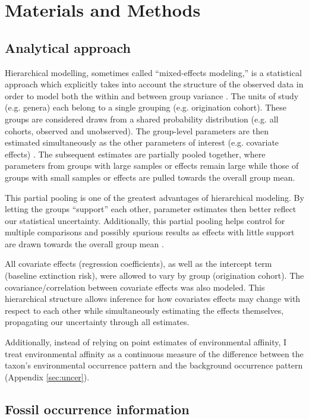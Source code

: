 \documentclass[12pt,letterpaper]{article}
\begin{document}
\section{Materials and Methods}

\subsection{Analytical approach}

Hierarchical modelling, sometimes called ``mixed-effects modeling,'' is a statistical approach which explicitly takes into account the structure of the observed data in order to model both the within and between group variance \citep{Gelman2013d,Gelman2007}. The units of study (e.g. genera) each belong to a single grouping (e.g. origination cohort). These groups are considered draws from a shared probability distribution (e.g. all cohorts, observed and unobserved). The group-level parameters are then estimated simultaneously as the other parameters of interest (e.g. covariate effects) \citep{Gelman2013d}. The subsequent estimates are partially pooled together, where parameters from groups with large samples or effects remain large while those of groups with small samples or effects are pulled towards the overall group mean. 

This partial pooling is one of the greatest advantages of hierarchical modeling. By letting the groups ``support'' each other, parameter estimates then better reflect our statistical uncertainty. Additionally, this partial pooling helps control for multiple comparisons and possibly spurious results as effects with little support are drawn towards the overall group mean \citep{Gelman2013d,Gelman2007}. 

All covariate effects (regression coefficients), as well as the intercept term (baseline extinction risk), were allowed to vary by group (origination cohort). The covariance/correlation between covariate effects was also modeled. This hierarchical structure allows inference for how covariates effects may change with respect to each other while simultaneously estimating the effects themselves, propagating our uncertainty through all estimates. 

Additionally, instead of relying on point estimates of environmental affinity, I treat environmental affinity as a continuous measure of the difference between the taxon's environmental occurrence pattern and the background occurrence pattern (Appendix \ref{sec:uncer}).


\subsection{Fossil occurrence information}
\end{document}
